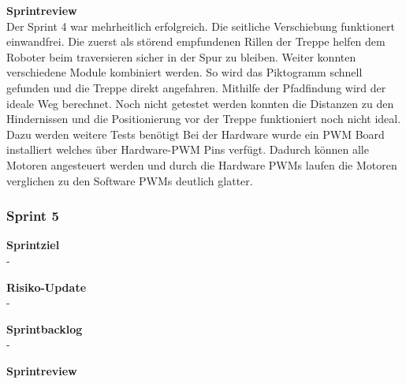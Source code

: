 \textbf{Sprintreview}\\
Der Sprint 4 war mehrheitlich erfolgreich. Die seitliche Verschiebung funktionert einwandfrei. Die zuerst als störend empfundenen Rillen der Treppe helfen dem Roboter beim traversieren sicher in der Spur zu bleiben. Weiter konnten verschiedene Module kombiniert werden. So wird das Piktogramm schnell gefunden und die Treppe direkt angefahren. Mithilfe der Pfadfindung wird der ideale Weg berechnet. Noch nicht getestet werden konnten die Distanzen zu den Hindernissen und die Positionierung vor der Treppe funktioniert noch nicht ideal. Dazu werden weitere Tests benötigt
Bei der Hardware wurde ein PWM  Board installiert welches über Hardware-PWM Pins verfügt. Dadurch können alle Motoren angesteuert werden und durch die Hardware PWMs laufen die Motoren verglichen zu den Software PWMs deutlich glatter.

\newpage

\subsubsection{Sprint 5}
\textbf{Sprintziel}\\
-

\textbf{Risiko-Update}\\
-

\textbf{Sprintbacklog}\\
-

\textbf{Sprintreview}\\

